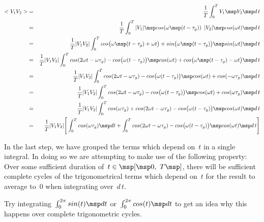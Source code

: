 
\begin{eqnarray}
  \label{eq:4}
  <V_1V_2> &=& \frac{1}{T} \int _0^T V_1 \msp V_2 \msp d\,t \nonumber \\
           &=& \frac{1}{T}       \int _0^T |V_1| \msp cos(\omega \msp (t - \tau _g)) \enspace |V_2| \msp cos(\omega t) \msp d\,t \nonumber \\
           &=& \frac{1}{T} |V_1V_2| \int _0^T cos  \big (\omega \msp (t - \tau _g) + \omega t \big) + sin  \big (\omega \msp (t - \tau _g)\big) \msp sin(\omega t) \msp d\,t \nonumber \\
           &=& \frac{1}{T} |V_1V_2| \int _0^T cos(2\omega t - \omega \tau _g) - cos  \big (\omega (t - \tau _g) \big) \msp cos(\omega t) + cos  \big (\omega \msp (t - \tau _g) - \omega t \big) \msp d\,t \nonumber \\
           &=& \frac{1}{T} |V_1V_2| \int _0^T cos(2\omega t - \omega \tau _g) - cos  \big (\omega (t - \tau _g) \big) \msp cos(\omega t) + cos(-\omega \tau _g) \msp d\,t \nonumber \\
           &=& \frac{1}{T} |V_1V_2| \int _0^T cos(2\omega t - \omega \tau _g) - cos  \big (\omega (t - \tau _g) \big) \msp cos(\omega t) + cos(\omega \tau _g) \msp d\,t \nonumber \\
           &=& \frac{1}{T} |V_1V_2| \int _0^T cos(\omega \tau _g) + cos(2\omega t - \omega \tau _g) - cos  \big (\omega (t - \tau _g) \big) \msp cos(\omega t) \msp d\,t \nonumber \\
           &=& \frac{1}{T} |V_1V_2| \Bigg [ \int _0^T cos(\omega \tau _g) \msp dt + \int _0^T cos(2\omega t - \omega \tau _g) - cos  \big (\omega (t - \tau _g) \big) \msp cos(\omega t) \msp d\,t \Bigg ] \nonumber
\end{eqnarray}

In the last step, we have grouped the terms which depend on~$t$ in a single integral. In doing so we are attempting to make use of the following property: Over some sufficient duration of~$t \in \msp [\msp 0,~T\msp ]$, there will be sufficient complete cycles of the trigonometrical terms which depend on~$t$ for the result to average to~0 when integrating over~$d\,t$.\\

\begin{braced}
  Try integrating~$\int _0^{2\pi} sin(t) \msp dt $ or~$\int _0^{2\pi} cos(t) \msp dt $ to get an idea why this happens over complete trigonometric cycles.
\end{braced}

